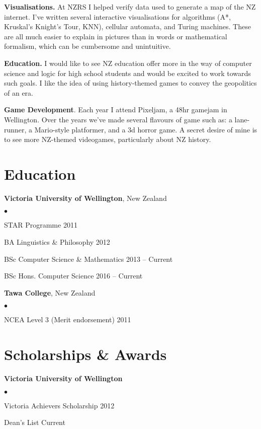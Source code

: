 \documentclass[margin,line]{res}
\newenvironment{list2}{
  \begin{list}{$\bullet$}{%
      \setlength{\itemsep}{0in}
      \setlength{\parsep}{0in} \setlength{\parskip}{0in}
      \setlength{\topsep}{0in} \setlength{\partopsep}{0in}
      \setlength{\leftmargin}{0.2in}}}
  {\end{list}}
\begin{document}
\begin{resume}
{\bf Visualisations.} At NZRS I helped verify data used to generate a map of the NZ internet. I've written several interactive visualisations for algorithms (A*, Kruskal's Knight's Tour, KNN), cellular automata, and Turing machines. These are all much easier to explain in pictures than in words or mathematical formalism, which can be cumbersome and unintuitive.

{\bf Education.} I would like to see NZ education offer more in the way of computer science and logic for high school students and would be excited to work towards such goals. I like the idea of using history-themed games to convey the geopolitics of an era.

{\bf Game Development}. Each year I attend Pixeljam, a 48hr gamejam in Wellington. Over the years we've made several flavours of game such as: a lane-runner, a Mario-style platformer, and a 3d horror game. A secret desire of mine is to see more NZ-themed videogames, particularly about NZ history.

\section{\sc Education}
{\bf Victoria University of Wellington}, New Zealand
\begin{list2}
	\item STAR Programme \hfill 2011
	\item BA Linguistics \& Philosophy \hfill 2012
	\item BSc Computer Science \& Mathematics \hfill 2013 -- Current
	\item BSc Hons. Computer Science \hfill 2016 -- Current
\end{list2}

{\bf Tawa College}, New Zealand
\begin{list2}
	\item NCEA Level 3 (Merit endorsement) \hfill 2011
\end{list2}

\section{\sc Scholarships \& Awards}

{\bf Victoria University of Wellington}
\begin{list2}
	\item Victoria Achievers Scholarship \hfill 2012
	\item Dean's List \hfill Current
\end{list2}


\end{resume}
\end{document}
